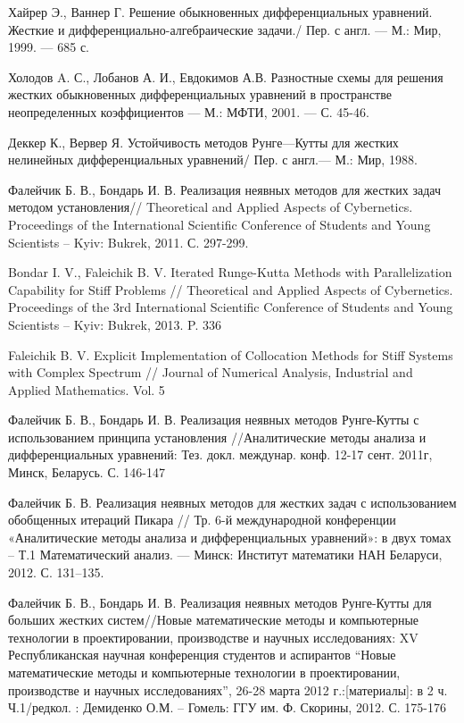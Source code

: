 \documentclass[a4paper,14pt]{extreport}
\begin{document}
\begin{thebibliography}{99}

Хайрер Э., Ваннер Г.  Решение обыкновенных дифференциальных уравнений. Жесткие и дифференциально-алгебраические задачи./ Пер. с англ. — М.: Мир, 1999. — 685 с.

Холодов A. С., Лобанов А. И., Евдокимов А.В. Разностные схемы для решения жестких обыкновенных дифференциальных уравнений в пространстве неопределенных коэффициентов — М.: МФТИ, 2001. — С. 45-46.

Деккер К., Вервер Я. Устойчивость методов Рунге—Кутты для жестких нелинейных дифференциальных уравнений/ Пер. с англ.— М.: Мир, 1988.

Фалейчик Б. В., Бондарь И. В. Реализация неявных методов для жестких задач методом установления// Theoretical and Applied Aspects of Cybernetics. Proceedings of the International Scientific Conference of Students and Young Scientists -- Kyiv: Bukrek, 2011. С. 297-299.

Bondar I. V., Faleichik B. V. Iterated Runge-Kutta Methods with Parallelization Capability for Stiff Problems // Theoretical and Applied Aspects of Cybernetics. Proceedings of the 3rd International Scientific Conference of Students and Young Scientists -- Kyiv: Bukrek, 2013. P. 336 

Faleichik B. V. Explicit Implementation of Collocation Methods for Stiff Systems with Complex Spectrum // Journal of Numerical Analysis, Industrial and Applied Mathematics. Vol. 5

Фалейчик Б. В., Бондарь И. В. Реализация неявных методов Рунге-Кутты с использованием принципа установления //Аналитические методы анализа и дифференциальных уравнений: Тез. докл. междунар. конф. 12-17 сент. 2011г, Минск, Беларусь. С. 146-147

Фалейчик Б. В. Реализация неявных методов для жестких задач с использованием обобщенных итераций Пикара // Тр. 6-й международной конференции «Аналитические методы анализа и дифференциальных уравнений»: в двух томах – Т.1 Математический анализ. — Минск: Институт математики НАН Беларуси, 2012. С. 131–135.

Фалейчик Б. В., Бондарь И. В. Реализация неявных методов Рунге-Кутты для больших жестких систем//Новые математические методы и компьютерные технологии в проектировании, производстве и научных исследованиях: XV Республиканская научная конференция студентов и аспирантов ``Новые математические методы и компьютерные технологии в проектировании, производстве и научных исследованиях'', 26-28 марта 2012 г.:[материалы]: в 2 ч. Ч.1/редкол. : Демиденко О.М. -- Гомель: ГГУ им. Ф. Скорины, 2012. С. 175-176


\end{thebibliography}
\end{document}
